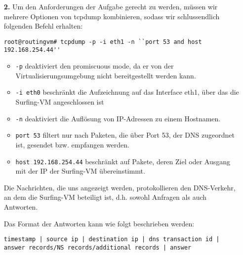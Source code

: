 \documentclass{scrartcl}
\begin{document}
    \begin{enumerate}
        \item[\bf 2.] Um den Anforderungen der Aufgabe gerecht zu werden, müssen
                      wir mehrere Optionen von tcpdump kombinieren, sodass wir
                      schlussendlich folgenden Befehl erhalten:
                      \begin{lstlisting}[style=BashInputStyle]
root@routingvm# tcpdump -p -i eth1 -n ``port 53 and host 192.168.254.44''
                      \end{lstlisting}

                      \begin{itemize}
                          \item \texttt{-p} deaktiviert den promiscuous mode, da
                                er von der Virtualisierungsumgebung nicht
                                bereitgestellt werden kann.
                          \item \texttt{-i eth0} beschränkt die Aufzeichnung
                                auf das Interface eth1, über das die Surfing-VM
                                angeschlossen ist
                          \item \texttt{-n} deaktiviert die Auflösung von IP-Adressen
                                zu einem Hostnamen.
                          \item \texttt{port 53} filtert nur nach Paketen, die
                                über Port 53, der DNS zugeordnet ist, gesendet bzw.
                                empfangen werden.
                          \item \texttt{host 192.168.254.44} beschränkt auf Pakete,
                                deren Ziel oder Ausgang mit der IP der Surfing-VM
                                übereinstimmt.
                      \end{itemize}

                      Die Nachrichten, die uns angezeigt werden, protokollieren
                      den DNS-Verkehr, an dem die Surfing-VM beteiligt ist, d.h.
                      sowohl Anfragen als auch Antworten.

                      Das Format der Antworten kann wie folgt beschrieben werden:

                      \texttt{timestamp | source ip | destination ip | dns transaction id | answer records/NS records/additional records | answer}


\end{enumerate}
\end{document}

